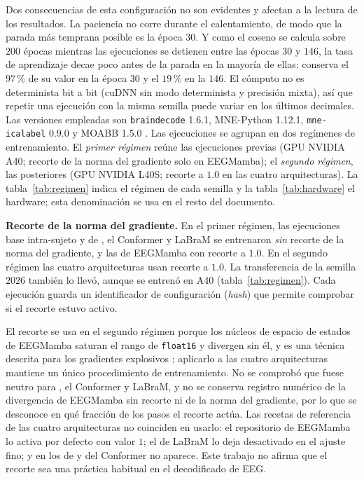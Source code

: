 Dos consecuencias de esta configuración no son evidentes y afectan a la lectura de los
resultados. La paciencia no corre durante el calentamiento, de modo que la parada más
temprana posible es la época $30$. Y como el coseno se calcula sobre $200$ épocas mientras
las ejecuciones \loso{} se detienen entre las épocas $30$ y $146$, la tasa de aprendizaje
decae poco antes de la parada en la mayoría de ellas: conserva el $97$\,\% de su valor en la
época $30$ y el $19$\,\% en la $146$. El cómputo no es determinista bit a bit (cuDNN sin modo determinista y precisión
mixta), así que repetir una ejecución con la misma semilla puede variar en los últimos
decimales. Las versiones empleadas son \texttt{braindecode} 1.6.1, MNE-Python 1.12.1,
\texttt{mne-icalabel} 0.9.0 y MOABB 1.5.0 \cite{jayaram2018moabb}. Las ejecuciones se
agrupan en dos regímenes de entrenamiento. El \emph{primer régimen} reúne las ejecuciones
previas (GPU NVIDIA A40; recorte de la norma del gradiente solo en EEGMamba); el
\emph{segundo régimen}, las posteriores (GPU NVIDIA L40S; recorte a $1.0$ en las cuatro
arquitecturas). La
tabla~\ref{tab:regimen} indica el régimen de cada semilla y la tabla~\ref{tab:hardware} el
hardware; esta denominación se usa en el resto del documento.

\textbf{Recorte de la norma del gradiente.}\label{sec:recorte-gradiente}
En el primer régimen, las ejecuciones base intra-sujeto y \loso{} de \eegnet{}, el
Conformer y LaBraM se entrenaron \emph{sin} recorte de la norma del gradiente, y las de
EEGMamba con recorte a $1.0$. En el segundo régimen las cuatro arquitecturas usan recorte a
$1.0$. La transferencia de la semilla $2026$ también lo llevó, aunque se entrenó en A40
(tabla~\ref{tab:regimen}). Cada ejecución guarda un identificador de configuración
(\textit{hash}) que permite comprobar si el recorte estuvo activo.

El recorte se usa en el segundo régimen porque los núcleos de espacio de estados de EEGMamba
saturan el rango de \texttt{float16} y divergen sin él, y es una técnica descrita para los
gradientes explosivos \cite{pascanu2013difficulty}; aplicarlo a las cuatro arquitecturas
mantiene un único procedimiento de entrenamiento. No se comprobó que fuese neutro para
\eegnet{}, el Conformer y LaBraM, y no se conserva registro numérico de la divergencia de
EEGMamba sin recorte ni de la norma del gradiente, por lo que se desconoce en qué fracción de
los pasos el recorte actúa. Las recetas de referencia de las cuatro arquitecturas no
coinciden en usarlo: el repositorio de EEGMamba \cite{wang2025eegmamba} lo activa por defecto
con valor $1$; el de LaBraM \cite{jiang2024labram} lo deja desactivado en el ajuste fino; y
en los de \eegnet{} \cite{lawhern2018} y del Conformer \cite{song2023conformer} no aparece.
Este trabajo no afirma que el recorte sea una práctica habitual en el decodificado de EEG.

